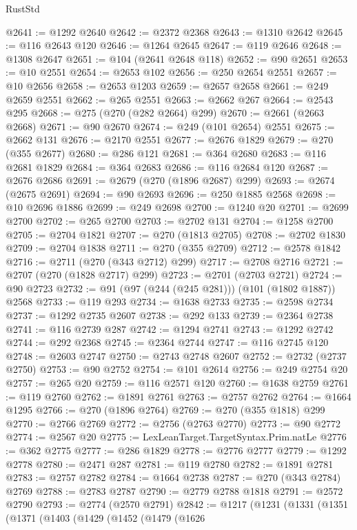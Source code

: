 \begin{lexlean}{RustStd}
\begin{coremodule}
@2641 := @1292 @2640
@2642 := @2372 @2368
@2643 := @1310 @2642
@2645 := @116 @2643 @120
@2646 := @1264 @2645
@2647 := @119 @2646
@2648 := @1308 @2647
@2651 := @104 (@2641 @2648 @118)
@2652 := @90 @2651
@2653 := @10 @2551
@2654 := @2653 @102
@2656 := @250 @2654 @2551
@2657 := @10 @2656
@2658 := @2653 @1203
@2659 := @2657 @2658
@2661 := @249 @2659 @2551
@2662 := @265 @2551
@2663 := @2662 @267
@2664 := @2543 @295
@2668 := @275 (@270 (@282 @2664) @299)
@2670 := @2661 (@2663 @2668)
@2671 := @90 @2670
@2674 := @249 (@101 @2654) @2551
@2675 := @2662 @131
@2676 := @2170 @2551
@2677 := @2676 @1829
@2679 := @270 (@355 @2677)
@2680 := @286 @121
@2681 := @364 @2680
@2683 := @116 @2681 @1829
@2684 := @364 @2683
@2686 := @116 @2684 @120
@2687 := @2676 @2686
@2691 := @2679 (@270 (@1896 @2687) @299)
@2693 := @2674 (@2675 @2691)
@2694 := @90 @2693
@2696 := @250 @1885 @2568
@2698 := @10 @2696 @1886
@2699 := @249 @2698
@2700 := @1240 @20
@2701 := @2699 @2700
@2702 := @265 @2700
@2703 := @2702 @131
@2704 := @1258 @2700
@2705 := @2704 @1821
@2707 := @270 (@1813 @2705)
@2708 := @2702 @1830
@2709 := @2704 @1838
@2711 := @270 (@355 @2709)
@2712 := @2578 @1842
@2716 := @2711 (@270 (@343 @2712) @299)
@2717 := @2708 @2716
@2721 := @2707 (@270 (@1828 @2717) @299)
@2723 := @2701 (@2703 @2721)
@2724 := @90 @2723
@2732 := @91 (@97 (@244 (@245 @281))) (@101 (@1802 @1887)) @2568
@2733 := @119 @293
@2734 := @1638 @2733
@2735 := @2598 @2734
@2737 := @1292 @2735 @2607
@2738 := @292 @133
@2739 := @2364 @2738
@2741 := @116 @2739 @287
@2742 := @1294 @2741
@2743 := @1292 @2742
@2744 := @292 @2368
@2745 := @2364 @2744
@2747 := @116 @2745 @120
@2748 := @2603 @2747
@2750 := @2743 @2748 @2607
@2752 := @2732 (@2737 @2750)
@2753 := @90 @2752
@2754 := @101 @2614
@2756 := @249 @2754 @20
@2757 := @265 @20
@2759 := @116 @2571 @120
@2760 := @1638 @2759
@2761 := @119 @2760
@2762 := @1891 @2761
@2763 := @2757 @2762
@2764 := @1664 @1295
@2766 := @270 (@1896 @2764)
@2769 := @270 (@355 @1818) @299
@2770 := @2766 @2769
@2772 := @2756 (@2763 @2770)
@2773 := @90 @2772
@2774 := @2567 @20
@2775 := LexLeanTarget.TargetSyntax.Prim.natLe
@2776 := @362 @2775
@2777 := @286 @1829
@2778 := @2776 @2777
@2779 := @1292 @2778
@2780 := @2471 @287
@2781 := @119 @2780
@2782 := @1891 @2781
@2783 := @2757 @2782
@2784 := @1664 @2738
@2787 := @270 (@343 @2784) @2769
@2788 := @2783 @2787
@2790 := @2779 @2788 @1818
@2791 := @2572 @2790
@2793 := @2774 (@2570 @2791)
@2842 := @1217
    (@1231
      (@1331
        (@1351
          (@1371
            (@1403
              (@1429
                (@1452
                  (@1479
                    (@1626

\end{coremodule}
\end{lexlean}
